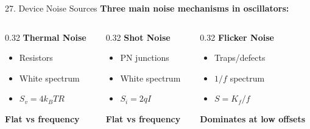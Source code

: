 \documentclass[aspectratio=169, 11pt]{beamer}
\begin{document}
\begin{frame}{27. Device Noise Sources}
    \textbf{Three main noise mechanisms in oscillators:}

    \vspace{0.5em}
    \begin{columns}[T]
        \begin{column}{0.32\textwidth}
            \textbf{Thermal Noise}
            \begin{itemize}
                \item Resistors
                \item White spectrum
                \item $S_v = 4k_BTR$
            \end{itemize}
            \textcolor{myblue}{\textbf{Flat vs frequency}}
        \end{column}
        \begin{column}{0.32\textwidth}
            \textbf{Shot Noise}
            \begin{itemize}
                \item PN junctions
                \item White spectrum
                \item $S_i = 2qI$
            \end{itemize}
            \textcolor{mygreen}{\textbf{Flat vs frequency}}
        \end{column}
        \begin{column}{0.32\textwidth}
            \textbf{Flicker Noise}
            \begin{itemize}
                \item Traps/defects
                \item $1/f$ spectrum
                \item $S = K_f/f$
            \end{itemize}
            \textcolor{myorange}{\textbf{Dominates at low offsets}}
        \end{column}
    \end{columns}
\end{frame}
\end{document}
